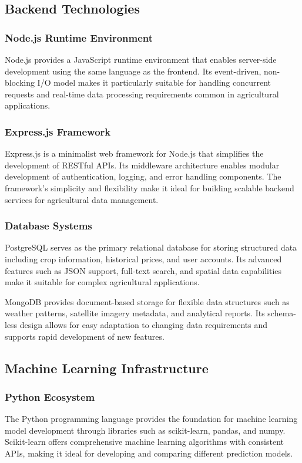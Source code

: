 \subsection{Backend Technologies}

\subsubsection{Node.js Runtime Environment}
Node.js provides a JavaScript runtime environment that enables server-side development using the same language as the frontend. Its event-driven, non-blocking I/O model makes it particularly suitable for handling concurrent requests and real-time data processing requirements common in agricultural applications.

\subsubsection{Express.js Framework}
Express.js is a minimalist web framework for Node.js that simplifies the development of RESTful APIs. Its middleware architecture enables modular development of authentication, logging, and error handling components. The framework's simplicity and flexibility make it ideal for building scalable backend services for agricultural data management.

\subsubsection{Database Systems}
PostgreSQL serves as the primary relational database for storing structured data including crop information, historical prices, and user accounts. Its advanced features such as JSON support, full-text search, and spatial data capabilities make it suitable for complex agricultural applications.

MongoDB provides document-based storage for flexible data structures such as weather patterns, satellite imagery metadata, and analytical reports. Its schema-less design allows for easy adaptation to changing data requirements and supports rapid development of new features.

\subsection{Machine Learning Infrastructure}

\subsubsection{Python Ecosystem}
The Python programming language provides the foundation for machine learning model development through libraries such as scikit-learn, pandas, and numpy. Scikit-learn offers comprehensive machine learning algorithms with consistent APIs, making it ideal for developing and comparing different prediction models.

